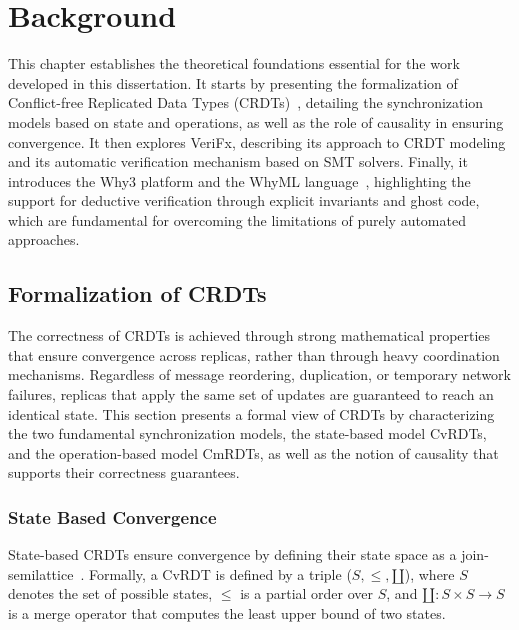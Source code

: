 
%

\makeatletter
\newcommand{\ntifpkgloaded}{%
  \@ifpackageloaded%
}
\makeatother


\chapter{Background}
\label{cha:background}

This chapter establishes the theoretical foundations essential for the work developed in this dissertation. It starts by presenting the formalization of Conflict-free Replicated Data Types (CRDTs)~\cite{preguica2018overview}, detailing the synchronization models based on state and operations, as well as the role of causality in ensuring convergence. It then explores VeriFx, describing its approach to CRDT modeling and its automatic verification mechanism based on SMT solvers. Finally, it introduces the Why3 platform and the WhyML language~\cite{whyml}, highlighting the support for deductive verification through explicit invariants and ghost code, which are fundamental for overcoming the limitations of purely automated approaches.

\section{Formalization of CRDTs}
\label{sec:formalization}

The correctness of CRDTs is achieved through strong mathematical properties that ensure convergence across replicas, rather than through heavy coordination mechanisms. Regardless of message reordering, duplication, or temporary network failures, replicas that apply the same set of updates are guaranteed to reach an identical state. This section presents a formal view of CRDTs by characterizing the two fundamental synchronization models, the state-based model CvRDTs, and the operation-based model CmRDTs, as well as the notion of causality that supports their correctness guarantees.

\subsection{State Based Convergence}
\label{sub:state_convergence}

State-based CRDTs ensure convergence by defining their state space as a join-semilattice~\cite{shapiro2011comprehensive}. Formally, a CvRDT is defined by a triple ($S, \leq, \amalg$), where $S$ denotes the set of possible states, $\leq$ is a partial order over $S$, and $\amalg: S \times S \rightarrow S$ is a merge operator that computes the least upper bound of two states.

